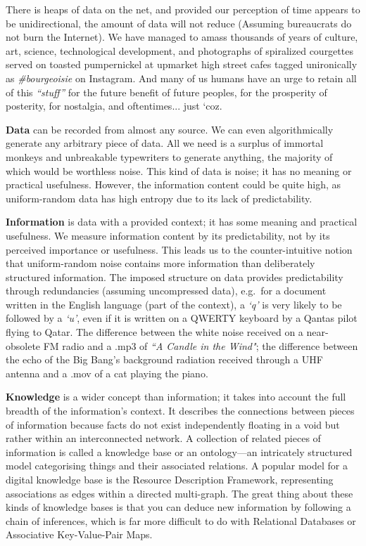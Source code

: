 There is heaps of data on the net, and provided our perception of time appears to be unidirectional, the amount of data will not reduce (Assuming bureaucrats do not burn the Internet). We have managed to amass thousands of years of culture, art, science, technological development, and photographs of spiralized courgettes served on toasted pumpernickel at upmarket high street cafes tagged unironically as \textit{\#bourgeoisie} on Instagram. And many of us humans have an urge to retain all of this \textit{``stuff''} for the future benefit of future peoples, for the prosperity of posterity, for nostalgia, and oftentimes... just `coz.

\textbf{Data} can be recorded from almost any source. We can even algorithmically generate any arbitrary piece of data. All we need is a surplus of immortal monkeys and unbreakable typewriters to generate anything, the majority of which would be worthless noise. This kind of data is noise; it has no meaning or practical usefulness. However, the information content could be quite high, as uniform-random data has high entropy due to its lack of predictability.

\textbf{Information} is data with a provided context; it has some meaning and practical usefulness. We measure information content by its predictability, not by its perceived importance or usefulness. This leads us to the counter-intuitive notion that uniform-random noise contains more information than deliberately structured information. The imposed structure on data provides predictability through redundancies (assuming uncompressed data), e.g.\ for a document written in the English language (part of the context), a \textit{`q'} is very likely to be followed by a \textit{`u'}, even if it is written on a QWERTY keyboard by a Qantas pilot flying to Qatar. The difference between the white noise received on a near-obsolete FM radio and a .mp3 of \textit{``A Candle in the Wind"}; the difference between the echo of the Big Bang's background radiation received through a UHF antenna and a .mov of a cat playing the piano.

\textbf{Knowledge} is a wider concept than information; it takes into account the full breadth of the information's context. It describes the connections between pieces of information because facts do not exist independently floating in a void but rather within an interconnected network. A collection of related pieces of information is called a knowledge base or an ontology—an intricately structured model categorising things and their associated relations. A popular model for a digital knowledge base is the Resource Description Framework, representing associations as edges within a directed multi-graph. The great thing about these kinds of knowledge bases is that you can deduce new information by following a chain of inferences, which is far more difficult to do with Relational Databases or Associative Key-Value-Pair Maps.

